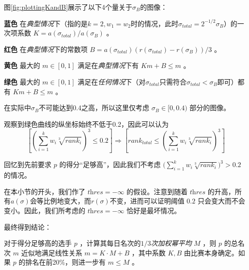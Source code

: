             图\ref{fig:plottingKandB}展示了以下4个量关于$\sigma_B$的图像：
            \begin{asparaitem}
                \vspace{1ex}
                \item [\textbf{蓝色}] 在\emph{典型情况}下（指的是$k=2,w_1=w_2$时的情况，此时$\sigma_{\textit{total}}=2^{-1/2}\sigma_B$）的一次项系数 $K=a(\sigma_{\textit{total}})/a(\sigma_B)$ 。
                \vspace{1ex}
                \item [\textbf{红色}] 在\emph{典型情况}下的常数项 $B=a(\sigma_{\textit{total}})\left(r(\sigma_{\textit{total}})-r(\sigma_B)\right)/3$ 。
                \vspace{1ex}
                \item [\textbf{黄色}] 最大的 $m\in [0,1]$ 满足在\emph{典型情况}下有 $Km+B\leq m$ 。
                \vspace{1ex}
                \item [\textbf{绿色}] 最大的 $m\in [0,1]$ 满足在\emph{任何情况}下（对$\sigma_{\textit{total}}$只需符合$\sigma_{\textit{total}}<\sigma_B$即可）都有 $Km+B\leq m$ 。
                \vspace{1ex}
            \end{asparaitem}

            在实际中$\sigma_B$不可能达到0.4之高，所以这里仅考虑 $\sigma_B\in [0,0.4)$ 部分的图像。

            观察到绿色曲线的纵坐标始终不低于0.2，因此可以认为
            $$
            \left[\left(\sum\limits_{i=1}^k w_i\sqrt[3]{\textit{rank}_i}\right)^3\leq 0.2\right]\Rightarrow
            \left[\textit{rank}_{\textit{total}}\leq\left(\sum\limits_{i=1}^k w_i\sqrt[3]{\textit{rank}_i}\right)^3\right]
            $$

            回忆到先前要求 $p$ 的得分“足够高”，因此我们不考虑 $\big(\sum_{i=1}^k w_i\sqrt[3]{\textit{rank}_i}\big)^3>0.2$ 的情况。

            在本小节的开头，我们作了 $\textit{thres}=-\infty$ 的假设。注意到随着 $\textit{thres}$ 的升高，所有$a(\sigma)$会等比例地变大，而$r(\sigma)$不变，进而可以证明阈值 $0.2$ 只会变大而不会变小。因此，我们所考虑的 $\textit{thres}=-\infty$ 恰好是最坏情况。

            \vspace{1.5ex}

            最终得到结论：

            \begin{tcolorbox}[colback=white,colframe=black,boxrule=0.5pt,arc=0pt]
                对于得分足够高的选手 $p$ ，计算其每日名次的\emph{$1/3$次加权幂平均} $M$ ，则 $p$ 的总名次 $m$ 近似地满足线性关系 $m=K\cdot M+B$ ，其中系数 $K,B$ 由比赛本身确定。如果 $p$ 的排名在前20\%，则进一步有 $m\leq M$ 。
            \end{tcolorbox}

